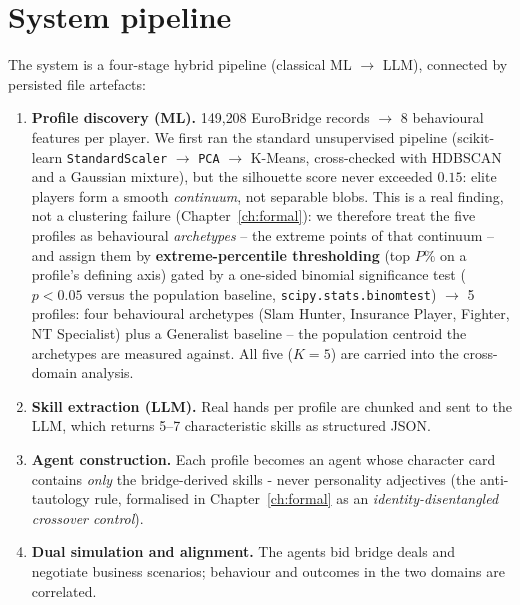 \documentclass[11pt, a4paper, oneside, openany]{report}
\begin{document}
\section{System pipeline}
The system is a four-stage hybrid pipeline (classical ML $\rightarrow$ LLM),
connected by persisted file artefacts:

\begin{enumerate}[leftmargin=*]
  \item \textbf{Profile discovery (ML).} 149{,}208 EuroBridge records
        $\rightarrow$ 8 behavioural features per player. We first ran the
        standard unsupervised pipeline (scikit-learn
        \texttt{StandardScaler} $\rightarrow$ \texttt{PCA} $\rightarrow$
        K-Means, cross-checked with HDBSCAN and a Gaussian mixture),
        but the silhouette score never exceeded $0.15$: elite players form
        a smooth \emph{continuum}, not separable blobs. This is a real
        finding, not a clustering failure (Chapter~\ref{ch:formal}): we
        therefore treat the five profiles as behavioural \emph{archetypes} --
        the extreme points of that continuum -- and assign them by
        \textbf{extreme-percentile thresholding} (top $P\%$ on a profile's
        defining axis) gated by a one-sided binomial significance test
        ($p<0.05$ versus the population baseline,
        \texttt{scipy.stats.\allowbreak binomtest}) $\rightarrow$ 5 profiles:
        four behavioural archetypes (Slam Hunter, Insurance Player, Fighter,
        NT Specialist) plus a Generalist baseline -- the population centroid
        the archetypes are measured against. All five ($K=5$) are carried into
        the cross-domain analysis.
  \item \textbf{Skill extraction (LLM).} Real hands per profile are chunked
        and sent to the LLM, which returns 5--7 characteristic skills as
        structured JSON.
  \item \textbf{Agent construction.} Each profile becomes an agent whose
        character card contains \emph{only} the bridge-derived skills -
        never personality adjectives (the anti-tautology rule, formalised in
        Chapter~\ref{ch:formal} as an \emph{identity-disentangled crossover
        control}).
  \item \textbf{Dual simulation and alignment.} The agents bid bridge deals
        and negotiate business scenarios; behaviour and outcomes in the two
        domains are correlated.
\end{enumerate}
\end{document}
